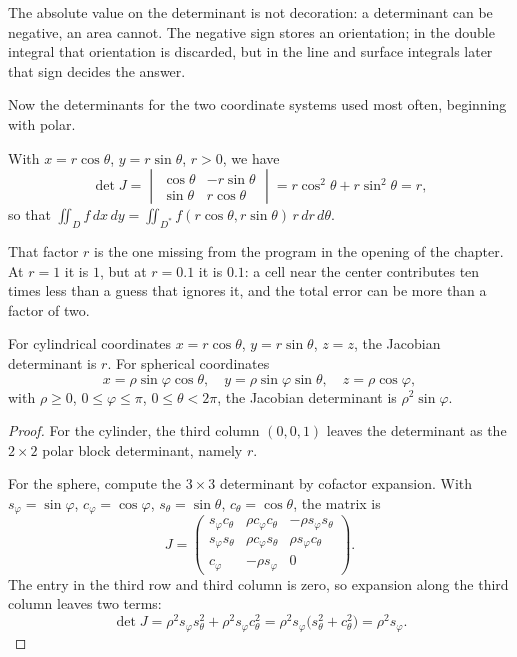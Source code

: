 The absolute value on the determinant is not decoration: a determinant can be negative, an area cannot.
The negative sign stores an orientation; in the double integral that orientation is discarded, but
in the line and surface integrals later that sign decides the answer.

Now the determinants for the two coordinate systems used most often,
beginning with polar.

\begin{proposisi}
With $x=r\cos\theta$, $y=r\sin\theta$, $r>0$, we have
\[
\det J=\begin{vmatrix}\cos\theta & -r\sin\theta\\ \sin\theta & r\cos\theta
\end{vmatrix}=r\cos^{2}\theta+r\sin^{2}\theta=r ,
\]
so that
$\iint_{D}f\,dx\,dy=\iint_{D^{*}}f(r\cos\theta,r\sin\theta)\,r\,dr\,d\theta$.
\end{proposisi}

That factor $r$ is the one missing from the program in the opening of the chapter. At $r=1$
it is $1$, but at $r=0.1$ it is $0.1$: a cell near the center
contributes ten times less than a guess that ignores it, and
the total error can be more than a factor of two.

\begin{proposisi}
 For cylindrical coordinates
$x=r\cos\theta$, $y=r\sin\theta$, $z=z$, the Jacobian determinant is $r$. For
spherical coordinates
\[
x=\rho\sin\varphi\cos\theta,\quad
y=\rho\sin\varphi\sin\theta,\quad
z=\rho\cos\varphi ,
\]
with $\rho\ge0$, $0\le\varphi\le\pi$, $0\le\theta<2\pi$, the Jacobian
determinant is $\rho^{2}\sin\varphi$.
\end{proposisi}

\begin{proof}
For the cylinder, the third column $(0,0,1)$ leaves the determinant as the $2\times2$
polar block determinant, namely $r$.

For the sphere, compute the $3\times3$ determinant by cofactor expansion. With
$s_{\varphi}=\sin\varphi$, $c_{\varphi}=\cos\varphi$,
$s_{\theta}=\sin\theta$, $c_{\theta}=\cos\theta$, the matrix is
\[
J=\begin{pmatrix}
s_{\varphi}c_{\theta} & \rho c_{\varphi}c_{\theta} & -\rho s_{\varphi}s_{\theta}\\
s_{\varphi}s_{\theta} & \rho c_{\varphi}s_{\theta} & \rho s_{\varphi}c_{\theta}\\
c_{\varphi} & -\rho s_{\varphi} & 0
\end{pmatrix}.
\]
The entry in the third row and third column is zero, so expansion along the third column leaves two
terms:
\[
\det J=\rho^{2}s_{\varphi}s_{\theta}^{2}+\rho^{2}s_{\varphi}c_{\theta}^{2}
=\rho^{2}s_{\varphi}\bigl(s_{\theta}^{2}+c_{\theta}^{2}\bigr)=\rho^{2}s_{\varphi}.
\]
\end{proof}

